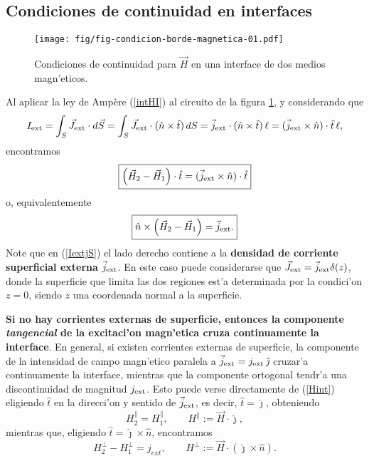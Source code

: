 \subsection{Condiciones de continuidad en interfaces}
\begin{figure}[!h]
\centerline{\texttt{[image: fig/fig-condicion-borde-magnetica-01.pdf]}}
\caption{Condiciones de continuidad para $\vec{H}$ en una interface de dos
medios magn'eticos.}
\label{BM1}
\end{figure}
Al aplicar la ley de Amp\`ere (\ref{intHI}) al circuito de la figura \ref{BM1},
y considerando que
\begin{equation}\label{IextjS}
 I_{\rm ext}=\int_S\vec{J}_{\rm ext}\cdot d\vec{S}=\int_S\vec{J}_{\rm ext}\cdot
(\hat{n}\times\hat{t})\,dS=\vec{j}_{\rm ext}\cdot
(\hat{n}\times\hat{t})\,\ell=(\vec{j}_{\rm ext}\times\hat{n})\cdot\hat{t}\,\ell ,
\end{equation}
encontramos
\begin{equation}
 \boxed{\left(\vec{H}_2-\vec{H}_1\right)\cdot\hat{t}=(\vec{j}_{\rm
ext}\times\hat{n})\cdot\hat{t}} \label{Hint}
\end{equation}
o, equivalentemente
\begin{equation}
\boxed{\hat{n}\times\left(\vec{H}_2-\vec{H}_1\right)=\vec{j}_{\rm
ext}.}
\end{equation}
Note que en (\ref{IextjS}) el lado derecho contiene a la \textbf{densidad de corriente superficial externa} $\vec{j}_{\rm ext}$. En este caso puede considerarse que $\vec{J}_{\rm ext}=\vec{j}_{\rm ext}\delta(z)$, donde la superficie que limita las dos regiones est'a determinada por la condici'on $z=0$, siendo $z$ una coordenada normal a la superficie.

\textbf{Si no hay corrientes externas de superficie, entonces la componente \textit{tangencial} de la excitaci'on magn'etica cruza continuamente la interface}. En general, si
existen corrientes externas de superficie, la componente de la intensidad de
campo magn'etico paralela a $\vec{j}_{\rm ext}=j_{\rm ext}\,\hat{\jmath}$ cruzar'a continuamente la interface, mientras que la componente ortogonal tendr'a una discontinuidad de magnitud $j_{\rm ext}$. Esto puede verse directamente
de (\ref{Hint}) eligiendo $\hat{t}$ en la direcci'on y sentido de
$\vec{j}_{\rm ext}$, es decir, $\hat{t}=\hat{\jmath}$, obteniendo
\begin{equation}
 H_2^\parallel=H_1^\parallel,  \qquad H^\parallel:=\vec{H}\cdot\hat{\jmath},
\end{equation}
mientras que, eligiendo $\hat{t}=\hat{\jmath}\times\hat{n}$, encontramos
\begin{equation}
 H_2^\perp-H_1^\perp=j_{ext},  \qquad
H^\perp:=\vec{H}\cdot(\hat{\jmath}\times\hat{n}).
\end{equation}

